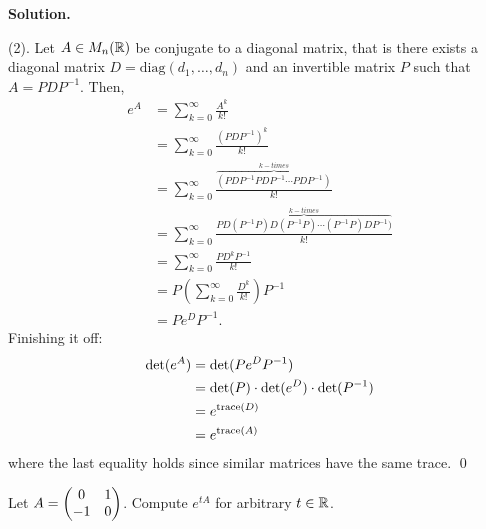 \documentclass[12pt]{book}
\theoremstyle{definition}
\newenvironment{solution}
{%
  \par\noindent\textbf{Solution.}\quad
}
{%
  \qed\par
}
\begin{document}
\begin{solution}
  (2). Let $A \in M_n(\mathbb{R})$ be conjugate to a diagonal matrix, that is there exists a diagonal matrix $D = \text{diag}(d_1, \dots, d_n)$ and an invertible matrix $P$ such that $A = PDP^{-1}$.
  Then,
  \[
  \begin{aligned}
    e^A &= \sum_{k=0}^\infty \frac{A^k}{k!} \\
        &= \sum_{k=0}^\infty \frac{(PDP^{-1})^k}{k!} \\
        &= \sum_{k=0}^\infty \frac{\overbrace{(PDP^{-1}PDP^{-1} \cdots PDP^{-1})}^{k-times}}{k!} \\
        &= \sum_{k=0}^\infty \frac{\overbrace{PD(P^{-1}P)D(P^{-1}P) \cdots (P^{-1}P)DP^{-1})}^{k-times}}{k!} \\
        &= \sum_{k=0}^\infty \frac{PD^kP^{-1}}{k!} \\
        &= P \left( \sum_{k=0}^\infty \frac{D^k}{k!} \right) P^{-1} \\
        &= P e^D P^{-1}.
  \end{aligned}
  \]
  Finishing it off:
  \[
  \begin{aligned}
    \det(e^A) &= \det(Pe^DP^{-1}) \\
              &= \det(P) \cdot \det(e^D) \cdot \det(P^{-1}) \\
              &= e^{\text{trace}({D})} \\
              &= e^{\text{trace}({A})}
  \end{aligned}
  \]
  where the last equality holds since similar matrices have the same trace. 
\end{solution}

\begin{taggedexercise}[\textcolor{yellow}{WIP}]
  Let $A = \begin{pmatrix} 0 & 1 \\ -1 & 0 \end{pmatrix}$. Compute $e^{tA}$ for arbitrary $t \in \mathbb{R}$.
\end{taggedexercise}
\end{document}
